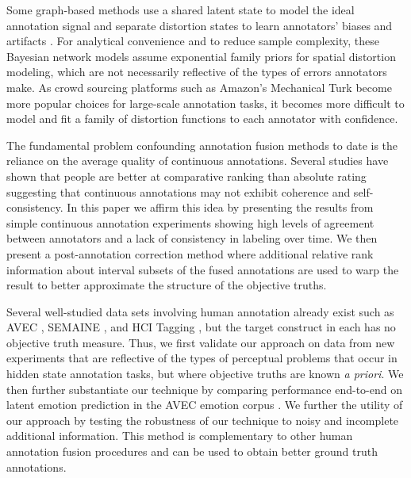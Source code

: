 \documentclass[10pt,letterpaper]{article}
\begin{document}
Some graph-based methods use a shared latent state to model the ideal annotation signal and separate distortion states to learn annotators' biases and artifacts \cite{audhkhasi2013globally, zhu2015fusing, Gupta2016}.  For analytical convenience and to reduce sample complexity, these Bayesian network models assume exponential family priors for spatial distortion modeling, which are not necessarily reflective of the types of errors annotators make.  As crowd sourcing platforms such as Amazon's Mechanical Turk become more popular choices for large-scale annotation tasks, it becomes more difficult to model and fit a family of distortion functions to each annotator with confidence.

The fundamental problem confounding annotation fusion methods to date is the reliance on the average quality of continuous annotations.  Several studies have shown that people are better at comparative ranking than absolute rating \cite{Yannakakis2011, metallinou2013annotation, yannakakis2015ratings} suggesting that continuous annotations may not exhibit coherence and self-consistency.  In this paper we affirm this idea by presenting the results from simple continuous annotation experiments showing high levels of agreement between annotators and a lack of consistency in labeling over time.  We then present a post-annotation correction method where additional relative rank information about interval subsets of the fused annotations are used to warp the result to better approximate the structure of the objective truths.

Several well-studied data sets involving human annotation already exist such as AVEC \cite{valstar2016avec}, SEMAINE \cite{mckeown2012semaine}, and HCI Tagging \cite{soleymani2012multimodal}, but the target construct in each has no objective truth measure. Thus, we first validate our approach on data from new experiments that are reflective of the types of perceptual problems that occur in hidden state annotation tasks, but where objective truths are known \textit{a priori}.  We then further substantiate our technique by comparing performance end-to-end on latent emotion prediction in the AVEC emotion corpus \cite{valstar2016avec}.  We further the utility of our approach by testing the robustness of our technique to noisy and incomplete additional information. This method is complementary to other human annotation fusion procedures and can be used to obtain better ground truth annotations.
\end{document}
